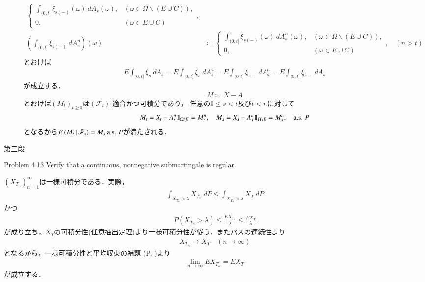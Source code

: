 \begin{prf}
\begin{description}
\begin{align}
\begin{cases}
						\displaystyle\int_{(0,t]} \xi_{s(-)}(\omega)\ dA_s(\omega), & (\omega \in \Omega \backslash (E \cup C)), \\
						0, & (\omega \in E \cup C)
					\end{cases}, \\
					\left( \int_{(0,t]} \xi_{s(-)}\ dA^n_s \right)(\omega) &\coloneqq
					\begin{cases}
						\displaystyle\int_{(0,t]} \xi_{s(-)}(\omega)\ dA^n_s(\omega), & (\omega \in \Omega \backslash (E \cup C)), \\
						0, & (\omega \in E \cup C)
					\end{cases},
					\quad (n > t)
				\end{align}
				とおけば
				\begin{align}
					E \int_{(0,t]} \xi_s\ dA_s = E \int_{(0,t]} \xi_s\ dA^n_s 
					= E \int_{(0,t]} \xi_{s-}\ dA^n_s = E \int_{(0,t]} \xi_{s-}\ dA_s
				\end{align}
				が成立する．
				\begin{align}
					M \coloneqq X - A
				\end{align}
				とおけば$(M_t)_{t \geq 0}$は$(\mathscr{F}_t)$-適合かつ可積分であり，
				任意の$0 \leq s < t$及び$t < n$に対して
				\begin{align}
					M_t = X_t - A^n_t \mbox{1}\hspace{-0.25em}\mbox{l}_{\Omega \backslash E} = M^n_t,
					\quad M_s = X_s - A^n_s \mbox{1}\hspace{-0.25em}\mbox{l}_{\Omega \backslash E} = M^n_s,
					\quad \mbox{a.s. $P$}
				\end{align}
				となるから$E\left( M_t \, \middle|\, \mathscr{F}_s \right) = M_s\ \mbox{a.s. $P$}$が満たされる．
			
			\item[第三段]
				
		\end{description}
	\end{prf}
	
	\begin{itembox}[l]{Problem 4.13}
		Verify that a continuous, nonnegative submartingale is regular. 
	\end{itembox}
	
	\begin{prf}
		$(X_{T_n})_{n=1}^\infty$は一様可積分である．実際，
		\begin{align}
			\int_{X_{T_n} > \lambda} X_{T_n}\ dP
			\leq \int_{X_{T_n} > \lambda} X_T\ dP
		\end{align}
		かつ
		\begin{align}
			P\left( X_{T_n} > \lambda \right)
			\leq \frac{EX_{T_n}}{\lambda}
			\leq \frac{EX_T}{\lambda}
		\end{align}
		が成り立ち，$X_T$の可積分性(任意抽出定理)より一様可積分性が従う．またパスの連続性より
		\begin{align}
			X_{T_n} \longrightarrow X_T
			\quad (n \longrightarrow \infty)
		\end{align}
		となるから，一様可積分性と平均収束の補題 (P. \pageref{lem:uniformly_integrable_and_convergence_in_mean})より
		\begin{align}
			\lim_{n \to \infty} EX_{T_n} = EX_T
		\end{align}
		が成立する．
		\QED
	\end{prf}
	